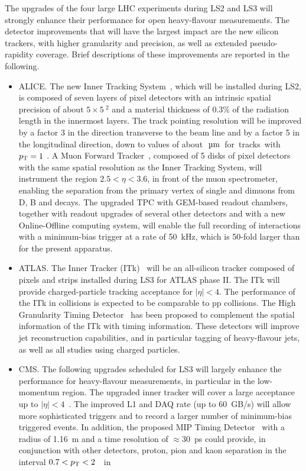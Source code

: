 The upgrades of the four large LHC experiments during LS2 and LS3 will strongly enhance their performance for open heavy-flavour measurements. The detector improvements that will have the largest impact are the new silicon trackers, with higher granularity and precision, as well as extended pseudo-rapidity coverage. Brief descriptions of these improvements are reported in the following.

\begin{itemize}
\item ALICE. The new Inner Tracking System~\cite{Abelev:1625842}, which will be installed during LS2, is composed of seven layers of pixel detectors with an intrinsic spatial precision of about $5\times 5~$\Uum$^2$ and a material thickness of 0.3\% of the radiation length in the innermost layers. The track pointing resolution will be improved by a factor 3 in the direction transverse to the beam line and by a factor 5 in the longitudinal direction, down to values of about \unit[20]{$\Uum$} for tracks with $p\sb{\scriptstyle\mathrm{T}}=1~$\UGeVc. A Muon Forward Tracker~\cite{CERN-LHCC-2015-001}, composed of 5 disks of pixel detectors with the same spatial resolution as the Inner Tracking System, will instrument the region $2.5<\eta<3.6$, in front of the muon spectrometer, enabling the separation from the primary vertex of single and dimuons from D, B and \PJGy decays. The upgraded TPC with GEM-based readout chambers, together with readout upgrades of several other detectors and with a new Online-Offline computing system, will enable the full recording of \PbPb interactions with a minimum-bias trigger at a rate of 50~kHz, which is 50-fold larger than for the present apparatus.    
\item ATLAS.  The Inner Tracker (ITk)~\cite{ATL-PHYS-PUB-2016-025} will be an all-silicon tracker composed of pixels and strips installed during LS3 for ATLAS phase II.  The ITk will provide charged-particle tracking acceptance for $|\eta|<4$.  The performance of the ITk in \PbPb collisions is expected to be comparable to pp collisions.  The High Granularity Timing Detector~\cite{Collaboration:2623663} has been proposed to complement the spatial information of the ITk with timing information.  These detectors will improve jet reconstruction capabilities, and in particular tagging of heavy-flavour jets, as well as all studies using charged particles.
\item CMS. The following upgrades scheduled for LS3 will largely enhance the performance for heavy-flavour measurements, in particular in the low-momentum region. The upgraded inner tracker will cover a large acceptance up to $|\eta|<4$~\cite{Contardo:2020886}. The improved L1 and DAQ rate (up to 60~GB/s) will allow more sophisticated triggers and to record a larger number of minimum-bias triggered events. In addition, the proposed MIP Timing Detector~\cite{Collaboration:2272264} with a radius of 1.16~m and a time resolution of $\approx 30$~ps could provide, in conjunction with other detectors, proton, pion and kaon separation in the interval $0.7<p\sb{\scriptstyle\mathrm{T}} < 2$~\UGeVc~in 

\end{itemize}
